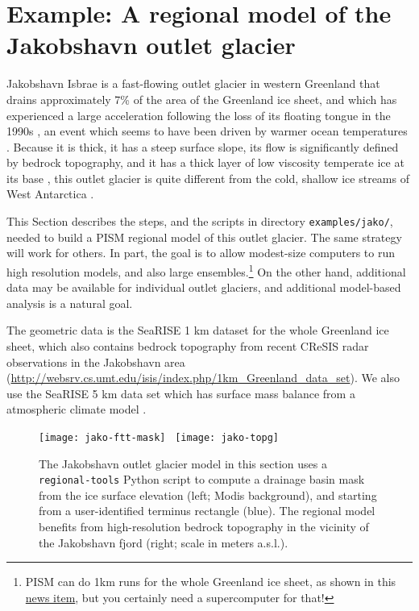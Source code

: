 
\section{Example: A regional model of the Jakobshavn outlet glacier}\label{sec:jako}  


Jakobshavn Isbrae is a fast-flowing outlet glacier in western Greenland that drains approximately 7\% of the area of the Greenland ice sheet, and which has experienced a large acceleration following the loss of its floating tongue in the 1990s \cite{JoughinAbdalatiFahnestock}, an event which seems to have been driven by warmer ocean temperatures \cite{Hollandetal2008}.  Because it is thick, it has a steep surface slope, its flow is significantly defined by bedrock topography, and it has a thick layer of low viscosity temperate ice at its base \cite{Luethietal2009}, this outlet glacier is quite different from the cold, shallow ice streams of West Antarctica \cite{TrufferEchelmeyer}.
 
This Section describes the steps, and the scripts in directory \texttt{examples/jako/}, needed to build a PISM regional model of this outlet glacier.  The same strategy will work for others.  In part, the goal is to allow modest-size computers to run high resolution models, and also large ensembles.\footnote{PISM can do 1km runs for the whole Greenland ice sheet, as shown in this \href{http://www.pism-docs.org/wiki/doku.php?id=news:first1km}{news item}, but you certainly need a supercomputer for that!}  On the other hand, additional data may be available for individual outlet glaciers, and additional model-based analysis is a natural goal.

The geometric data is the SeaRISE 1 km dataset for the whole Greenland ice sheet, which also contains bedrock topography from recent CReSIS radar observations in the Jakobshavn area (\small \url{http://websrv.cs.umt.edu/isis/index.php/1km_Greenland_data_set}\normalsize).  We also use the SeaRISE 5 km data set which has surface mass balance from a atmospheric climate model \cite{Ettemaetal2009}.

\begin{figure}[ht]
  \centering
  \texttt{[image: jako-ftt-mask]} \, \texttt{[image: jako-topg]}
  \caption{The Jakobshavn outlet glacier model in this section uses a \texttt{regional-tools} Python script to compute a drainage basin mask from the ice surface elevation (left; Modis background), and starting from a user-identified terminus rectangle (blue).  The regional model benefits from high-resolution bedrock topography in the vicinity of the Jakobshavn fjord (right; scale in meters a.s.l.).}
  \label{fig:jako-basin-topg}
\end{figure}

